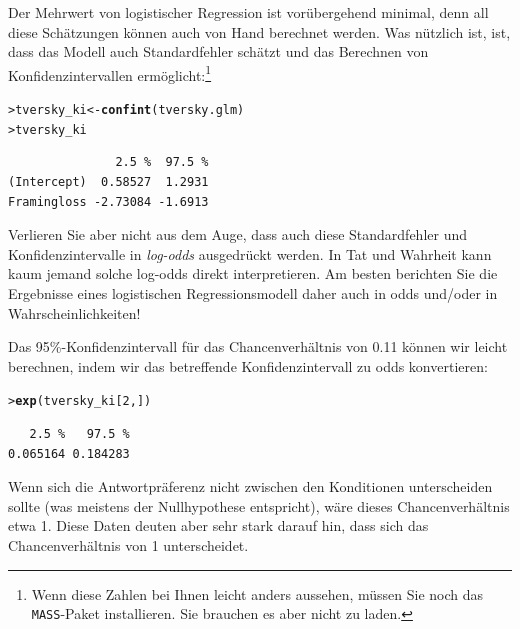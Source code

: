 \documentclass[oneside, 10pt]{book}\usepackage[]{graphicx}\usepackage[]{xcolor}
\makeatletter
\newcommand{\hlnum}[1]{\textcolor[rgb]{0.686,0.059,0.569}{#1}}%
\newcommand{\hlstd}[1]{\textcolor[rgb]{0.345,0.345,0.345}{#1}}%
\newcommand{\hlkwb}[1]{\textcolor[rgb]{0.69,0.353,0.396}{#1}}%
\newcommand{\hlkwd}[1]{\textcolor[rgb]{0.737,0.353,0.396}{\textbf{#1}}}%
\newenvironment{kframe}{%
 \def\at@end@of@kframe{}%
 \ifinner\ifhmode%
  \def\at@end@of@kframe{\end{minipage}}%
  \begin{minipage}{\columnwidth}%
 \fi\fi%
 \def\FrameCommand##1{\hskip\@totalleftmargin \hskip-\fboxsep
 \colorbox{shadecolor}{##1}\hskip-\fboxsep
     \hskip-\linewidth \hskip-\@totalleftmargin \hskip\columnwidth}%
 \MakeFramed {\advance\hsize-\width
   \@totalleftmargin\z@ \linewidth\hsize
   \@setminipage}}%
 {\par\unskip\endMakeFramed%
 \at@end@of@kframe}
\newenvironment{knitrout}{}{} %
\makeatother
\begin{document}
Der Mehrwert von logistischer Regression ist vorübergehend minimal,
denn all diese Schätzungen können auch von Hand berechnet werden.
Was nützlich ist, ist, dass das Modell auch Standardfehler
schätzt und das Berechnen von Konfidenzintervallen ermöglicht:\footnote{Wenn diese Zahlen bei Ihnen leicht anders aussehen, müssen Sie noch das \texttt{MASS}-Paket installieren. Sie brauchen es aber nicht zu laden.}
\begin{knitrout}
\color{fgcolor}\begin{kframe}
\begin{alltt}
\hlstd{> }\hlstd{tversky_ki} \hlkwb{<-} \hlkwd{confint}\hlstd{(tversky.glm)}
\hlstd{> }\hlstd{tversky_ki}
\end{alltt}
\begin{verbatim}
               2.5 %  97.5 %
(Intercept)  0.58527  1.2931
Framingloss -2.73084 -1.6913
\end{verbatim}
\end{kframe}
\end{knitrout}

Verlieren Sie aber nicht aus dem Auge, dass auch diese
Standardfehler und Konfidenzintervalle in \emph{log-odds} ausgedrückt
werden. In Tat und Wahrheit kann kaum jemand solche log-odds
direkt interpretieren. Am besten berichten Sie
die Ergebnisse eines logistischen Regressionsmodell daher
auch in odds und/oder in Wahrscheinlichkeiten!

Das 95\%-Konfidenzintervall für das Chancenverhältnis von 0.11
können wir leicht berechnen, indem wir das betreffende
Konfidenzintervall zu odds konvertieren:
\begin{knitrout}
\color{fgcolor}\begin{kframe}
\begin{alltt}
\hlstd{> }\hlkwd{exp}\hlstd{(tversky_ki[}\hlnum{2}\hlstd{, ])}
\end{alltt}
\begin{verbatim}
   2.5 %   97.5 % 
0.065164 0.184283 
\end{verbatim}
\end{kframe}
\end{knitrout}
Wenn sich die Antwortpräferenz nicht zwischen den
Konditionen unterscheiden sollte (was meistens der
Nullhypothese entspricht), wäre dieses Chancenverhältnis
etwa 1. Diese Daten deuten aber sehr stark darauf hin,
dass sich das Chancenverhältnis von 1 unterscheidet.
\end{document}
